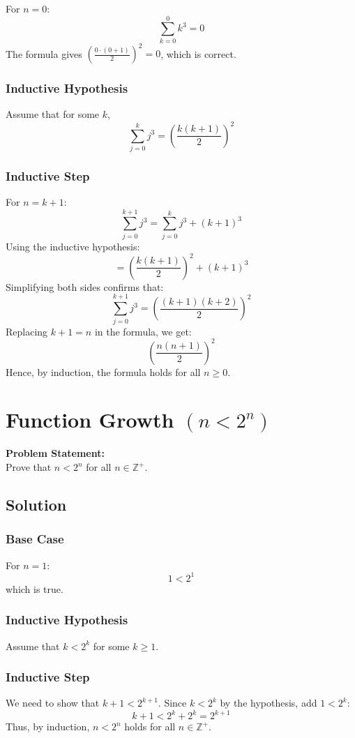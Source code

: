 \documentclass[10pt]{article}
\begin{document}
For \( n = 0 \):
\[
\sum_{k=0}^0 k^3 = 0
\]
The formula gives \( \left(\frac{0 \cdot (0+1)}{2}\right)^2 = 0 \), which is correct.

\subsubsection{Inductive Hypothesis}

Assume that for some \( k \),
\[
\sum_{j=0}^k j^3 = \left(\frac{k(k+1)}{2}\right)^2
\]

\subsubsection{Inductive Step}

For \( n = k+1 \):
\[
\sum_{j=0}^{k+1} j^3 = \sum_{j=0}^k j^3 + (k+1)^3
\]
Using the inductive hypothesis:
\[
= \left(\frac{k(k+1)}{2}\right)^2 + (k+1)^3
\]
Simplifying both sides confirms that:
\[
\sum_{j=0}^{k+1} j^3 = \left(\frac{(k+1)(k+2)}{2}\right)^2
\]
Replacing \( k+1 = n \) in the formula, we get:
\[
\left(\frac{n(n+1)}{2}\right)^2
\]
Hence, by induction, the formula holds for all \( n \geq 0 \).

\newpage

\section{Function Growth \((n < 2^n)\)}

\textbf{Problem Statement:} \\
Prove that \( n < 2^n \) for all \( n \in \mathbb{Z}^+ \).

\subsection{Solution}

\subsubsection{Base Case}

For \( n = 1 \):
\[
1 < 2^1
\]
which is true.

\subsubsection{Inductive Hypothesis}

Assume that \( k < 2^k \) for some \( k \geq 1 \).

\subsubsection{Inductive Step}

We need to show that \( k+1 < 2^{k+1} \). Since \( k < 2^k \) by the hypothesis, add \( 1 < 2^k \):
\[
k+1 < 2^k + 2^k = 2^{k+1}
\]
Thus, by induction, \( n < 2^n \) holds for all \( n \in \mathbb{Z}^+ \).
\end{document}
